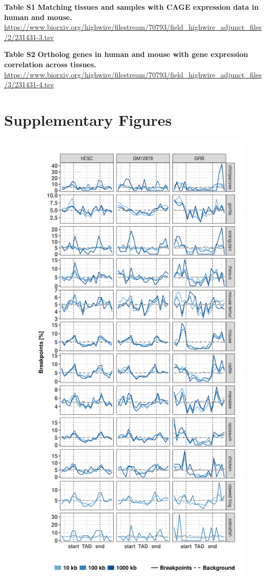 \documentclass[a4paper,twoside=true,openright,parskip=full,chapterprefix=true,11pt,headings=normal,bibliography=totoc,listof=totoc,titlepage=on,captions=tableabove,draft=false]{scrreprt}
\theoremstyle{definition}
\theoremstyle{definition}
\theoremstyle{definition}
\theoremstyle{remark}
\begin{document}
\textbf{Table S1} \textbf{Matching tissues and samples with CAGE
expression data in human and mouse.}
\url{https://www.biorxiv.org/highwire/filestream/70793/field_highwire_adjunct_files/2/231431-3.tsv}

\textbf{Table S2} \textbf{Ortholog genes in human and mouse with gene
expression correlation across tissues.}
\url{https://www.biorxiv.org/highwire/filestream/70793/field_highwire_adjunct_files/3/231431-4.tsv}

\section{Supplementary Figures}\label{supplementary-figures}

\begin{figure}

{\centering \includegraphics[width=0.8\linewidth]{figures/TAD_evolution/fig_S1_v01} 

}
\end{figure}
\end{document}
